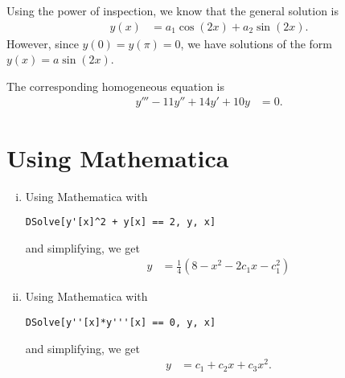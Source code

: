 \documentclass[10pt]{mypackage}
\begin{document}
\begin{solution}[Problem 38]
  Using the power of inspection, we know that the general solution is
  \begin{align*}
    y(x) &= a_1\cos\left(2x\right) + a_2\sin\left(2x\right).
  \end{align*}
  However, since $y(0) = y(\pi) = 0$, we have solutions of the form $y(x) = a\sin\left(2x\right)$.
\end{solution}
\begin{solution}[Problem 50]
  The corresponding homogeneous equation is
  \begin{align*}
    y''' - 11y'' + 14y' + 10y &=0.
  \end{align*}
\end{solution}
\section{Using Mathematica}%
\begin{enumerate}[(i)]
  \item Using Mathematica with
    \begin{lstlisting}[style=mathematicastyle]
      DSolve[y'[x]^2 + y[x] == 2, y, x]
    \end{lstlisting}
    and simplifying, we get
    \begin{align*}
      y &= \frac{1}{4}\left(8-x^2 - 2c_1x - c_1^2\right)
    \end{align*}
  \item Using Mathematica with
    \begin{lstlisting}[style=mathematicastyle]
      DSolve[y''[x]*y'''[x] == 0, y, x]
    \end{lstlisting}
    and simplifying, we get
    \begin{align*}
      y &= c_1 + c_2x + c_3x^2.
    \end{align*}
\end{enumerate}
\end{document}
